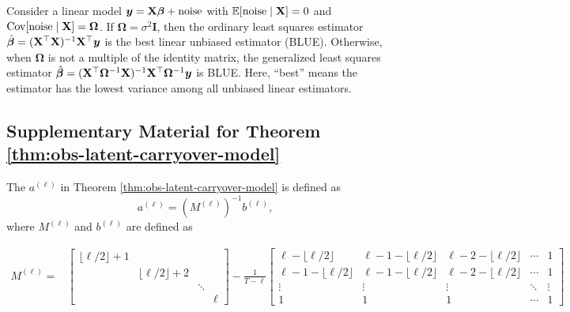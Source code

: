 	
		\begin{lemma}\label{lemma:gauss-markov}
		Consider a linear model $\bm{y} = \mathbf{X} \bm\beta + \text{noise}$ with $\mathbb{E}[\text{noise} \mid \mathbf{X}] = 0$ and $\textnormal{Cov}[\text{noise} \mid \mathbf{X}] = \bm\Omega$. If $\bm\Omega = \sigma^2 \bm I$, then the ordinary least squares estimator
		$\hat{\bm\beta} = (\mathbf{X}^\top \mathbf{X})^{-1} \mathbf{X}^\top \bm{y}$
		is the best linear unbiased estimator (BLUE). Otherwise, when $\bm\Omega$ is not a multiple of the identity matrix, the generalized least squares estimator $\hat{\bm\beta} = (\mathbf{X}^\top \bm\Omega^{-1} \mathbf{X})^{-1} \mathbf{X}^\top \bm\Omega^{-1} \bm{y}$
		is BLUE. Here, ``best'' means the estimator has the lowest variance among all unbiased linear estimators.
	\end{lemma}
		
		\subsection{Supplementary Material for Theorem \ref{thm:obs-latent-carryover-model}}\label{subsec:def-A-l-B-l}
		The $a^{(\ell)}$ in Theorem \ref{thm:obs-latent-carryover-model} is defined as
		\[a^{(\ell)} =  (M^{(\ell)})^{-1} b^{(\ell)}, \]
		where 
		$M^{(\ell)}$ and $b^{(\ell)}$ are defined as
		
		\begin{align}
		M^{(\ell)} =& \begin{bmatrix}
		\lfloor \ell/2 \rfloor+1 \\ & \lfloor \ell/2 \rfloor + 2 \\ && \ddots \\ &&& \ell 
		\end{bmatrix} - \frac{1}{T - \ell} \begin{bmatrix}
		\ell - \lfloor \ell/2 \rfloor & \ell  - 1 - \lfloor \ell/2 \rfloor & \ell  - 2 - \lfloor \ell/2 \rfloor & \cdots & 1 \\
		\ell  - 1 - \lfloor \ell/2 \rfloor & \ell  - 1 - \lfloor \ell/2 \rfloor & \ell  - 2 - \lfloor \ell/2 \rfloor & \cdots & 1 \\ 
		\vdots & \vdots & \vdots & \ddots & \vdots \\
		1 & 1 & 1 & \cdots &  1
		\end{bmatrix} \label{eqn:A-ell}
		\end{align}
		
